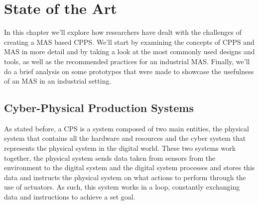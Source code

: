 


\glsresetall

\chapter{State of the Art}
\label{cha:state-of-the-art}

In this chapter we'll explore how researchers have dealt with the challenges of creating a \acrfull{MAS} based \acrfull{CPPS}. We'll start by  examining the concepts of \acrshort{CPPS} and \acrshort{MAS} in more detail and by taking a look at the most commonly used designs and tools, as well as the recommended practices for an industrial \acrshort{MAS}. Finally, we'll do a brief analysis on some prototypes that were made to showcase the usefulness of an \acrshort{MAS} in an industrial setting.

\section{Cyber-Physical Production Systems}
\label{sec:cyber-physical_production_systems}

As stated before, a \acrfull{CPS} is a system composed of two main entities, the physical system that contains all the hardware and resources and the cyber system that represents the physical system in the digital world. These two systems work together, the physical system sends data taken from sensors from the environment to the digital system and the digital system processes and stores this data and instructs the physical system on what actions to perform through the use of actuators. As such, this system works in a loop, constantly exchanging data and instructions to achieve a set goal.\\

